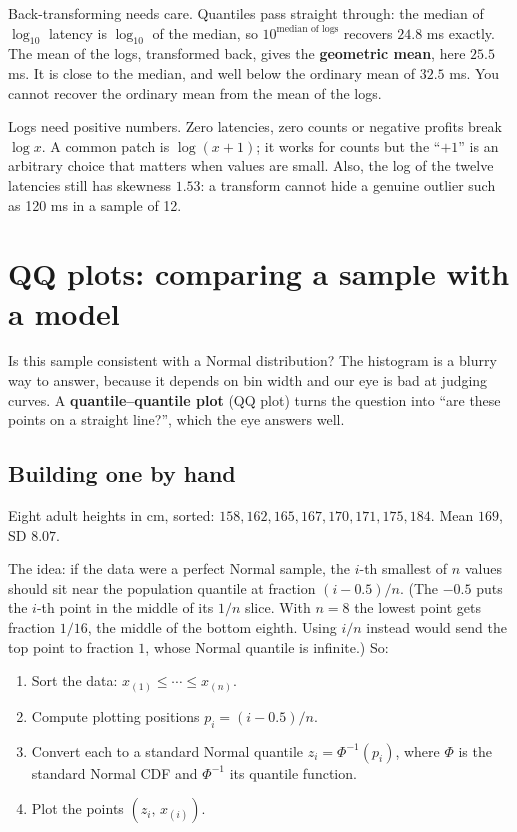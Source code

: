 Back-transforming needs care. Quantiles pass straight through: the median of
$\log_{10}$ latency is $\log_{10}$ of the median, so $10^{\text{median of logs}}$ recovers
$24.8$ ms exactly. The mean of the logs, transformed back, gives the \textbf{geometric
mean}, here $25.5$ ms. It is close to the median, and well below the ordinary mean of
$32.5$ ms. You cannot recover the ordinary mean from the mean of the logs.

\begin{trapbox}
Logs need positive numbers. Zero latencies, zero counts or negative profits break
$\log x$. A common patch is $\log(x + 1)$; it works for counts but the ``$+1$'' is an
arbitrary choice that matters when values are small. Also, the log of the twelve
latencies still has skewness $1.53$: a transform cannot hide a genuine outlier such as
120 ms in a sample of 12.
\end{trapbox}

\section{QQ plots: comparing a sample with a model}

Is this sample consistent with a Normal distribution? The histogram is a blurry way
to answer, because it depends on bin width and our eye is bad at judging curves. A
\textbf{quantile--quantile plot} (QQ plot) turns the question into ``are these points
on a straight line?'', which the eye answers well.

\subsection{Building one by hand}

Eight adult heights in cm, sorted: $158, 162, 165, 167, 170, 171, 175, 184$. Mean
$169$, SD $8.07$.

The idea: if the data were a perfect Normal sample, the $i$-th smallest of $n$ values
should sit near the population quantile at fraction $(i - 0.5)/n$. (The $-0.5$ puts the
$i$-th point in the middle of its $1/n$ slice. With $n=8$ the lowest point gets
fraction $1/16$, the middle of the bottom eighth. Using $i/n$ instead would send the
top point to fraction $1$, whose Normal quantile is infinite.) So:

\begin{enumerate}
  \item Sort the data: $x_{(1)} \le \cdots \le x_{(n)}$.
  \item Compute plotting positions $p_i = (i - 0.5)/n$.
  \item Convert each to a standard Normal quantile $z_i = \Phi^{-1}(p_i)$, where $\Phi$
  is the standard Normal CDF and $\Phi^{-1}$ its quantile function.
  \item Plot the points $(z_i,\, x_{(i)})$.
\end{enumerate}

